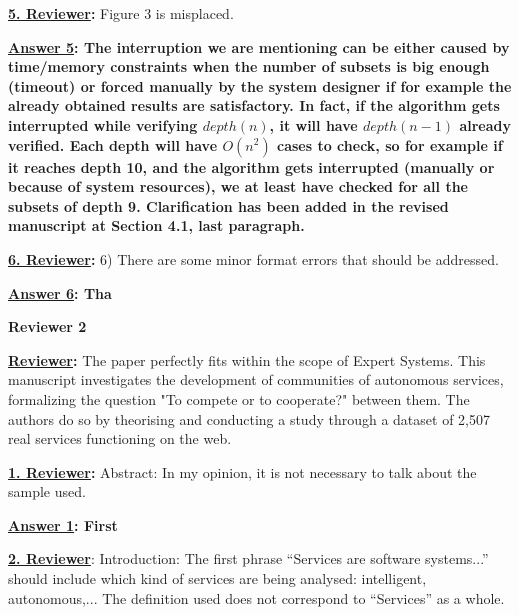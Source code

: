 \documentclass[times, 12pt,a4paper]{article}
\begin{document}
\vspace{0.5cm}\textbf{\underline{5. Reviewer}:} Figure 3 is misplaced.

\vspace{0.2cm}\textbf{\underline{Answer 5}: The interruption we
are mentioning can be either caused by time/memory constraints
when the number of subsets is big enough (timeout) or forced
manually by the system designer if for example the already
obtained results are satisfactory. In fact, if the algorithm gets
interrupted while verifying $depth(n)$, it will have $depth(n-1)$
already verified. Each depth will have $O(n^2)$ cases to check, so
for example if it reaches depth 10, and the algorithm gets
interrupted (manually or because of system resources), we at least
have checked for all the subsets of depth 9. Clarification has
been added in the revised manuscript at Section 4.1, last
paragraph.}


\vspace{0.5cm}\textbf{\underline{6. Reviewer}:} 6) There are some minor format errors that should be addressed.

\vspace{0.2cm}\textbf{\underline{Answer 6}: Tha
}



\vspace{2cm}

\newpage

\begin{center}
  \textbf{Reviewer 2}
\end{center}


\textbf{\underline{Reviewer}:} The paper perfectly fits within the scope of Expert Systems. This manuscript investigates the development of communities of autonomous services, formalizing the question "To compete or to cooperate?" between them. The authors do so by theorising and conducting a study through a dataset of 2,507 real services functioning on the web.


\vspace{0.5cm}\textbf{\underline{1. Reviewer}:}  Abstract: In my opinion, it is not necessary to talk about the sample used.

\vspace{0.2cm}\textbf{\underline{Answer 1}: First}

\vspace{0.5cm} \textbf{\underline{2. Reviewer}}:  Introduction: The first phrase ``Services are software systems...'' should include which kind of services are being analysed: intelligent, autonomous,... The definition used does not correspond to ``Services'' as a whole.
\end{document}
